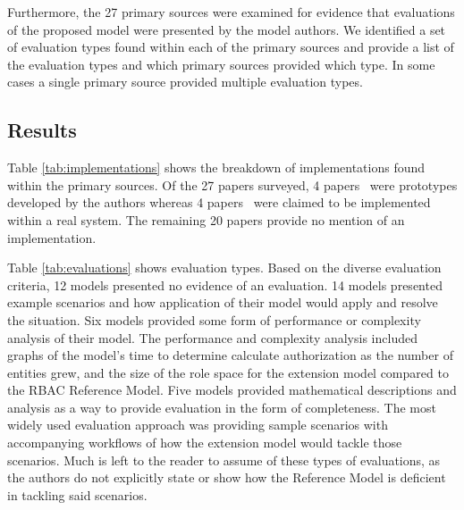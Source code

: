 Furthermore, the 27 primary sources were examined for evidence that evaluations of the proposed model were presented by the model authors. We identified a set of evaluation types found within  each of the primary sources and provide a list of the evaluation types and which primary sources provided which type.
In some cases a single primary source provided multiple evaluation types.

\subsection{Results}

Table \ref{tab:implementations} shows the breakdown of implementations found within the primary sources.
Of the 27 papers surveyed, 4 papers~\cite{zhou2007team,bao08:role, cholewka00:acontext-sensitive,huang06:pervasive} were prototypes developed by the authors whereas 4 papers~\cite{jian2008extended, aich09:role, yao2008task, motta03:contextual} were claimed to be implemented within a real
system. The remaining 20 papers provide no
mention of an implementation.  

Table \ref{tab:evaluations} shows evaluation types.
Based on the diverse evaluation criteria, 12 models presented no evidence of an evaluation. 14 models presented example scenarios
and how application of their model would apply and resolve the situation. Six models provided some form of performance
or complexity analysis of their model.  The performance and complexity analysis included graphs of the model's time to determine calculate authorization 
as the number of entities grew, and the size of the role space for the extension model compared to the RBAC Reference Model. 
Five models provided mathematical descriptions and analysis as a way to provide evaluation in the form of completeness. 
The most widely used evaluation approach was providing sample scenarios with accompanying workflows of how the extension model
would tackle those scenarios. Much is left to the reader to assume of these types of evaluations, as the authors do not explicitly state
or show how the Reference Model is deficient in tackling said scenarios.

